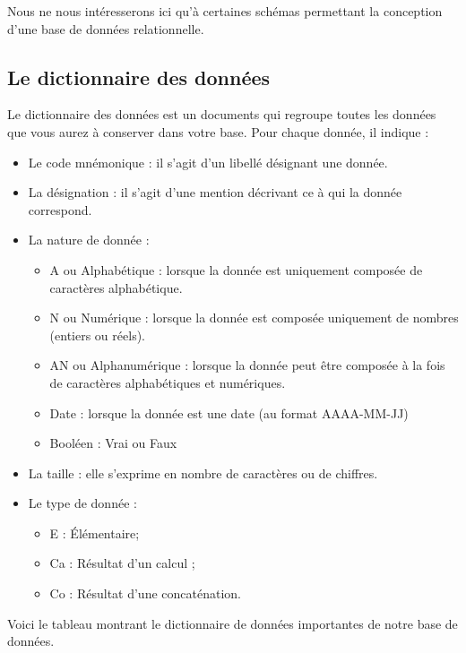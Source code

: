 Nous ne nous intéresserons ici qu'à certaines schémas permettant la conception d'une base de données relationnelle.

\subsection{Le dictionnaire des données}
Le dictionnaire des données est un documents qui regroupe toutes les données que vous aurez à conserver dans votre base. Pour chaque donnée, il indique : 
\begin{itemize}
	\item Le code mnémonique : il s'agit d'un libellé désignant une donnée.
	\item La désignation : il s'agit d'une mention décrivant ce à qui la donnée correspond.
	\item La nature de donnée : 
	\begin{itemize}
		\item [\textbullet] A ou Alphabétique : lorsque la donnée est uniquement composée de caractères alphabétique.
		\item [\textbullet] N ou Numérique : lorsque la donnée est composée uniquement de nombres (entiers ou réels).
		\item [\textbullet] AN ou Alphanumérique : lorsque la donnée peut être composée à la fois de caractères alphabétiques et numériques.
		\item [\textbullet] Date : lorsque la donnée est une date (au format AAAA-MM-JJ)
		\item [\textbullet] Booléen : Vrai ou Faux
	\end{itemize}
	\item La taille : elle s'exprime en nombre de caractères ou de chiffres.
	\item Le type de donnée :
	\begin{itemize}
		\item [\textbullet] E : Élémentaire;
		\item [\textbullet] Ca : Résultat d'un calcul ;
		\item [\textbullet] Co : Résultat d'une concaténation.
	\end{itemize}
\end{itemize}

\clearpage
Voici le tableau montrant le dictionnaire de données importantes de notre base de données.


